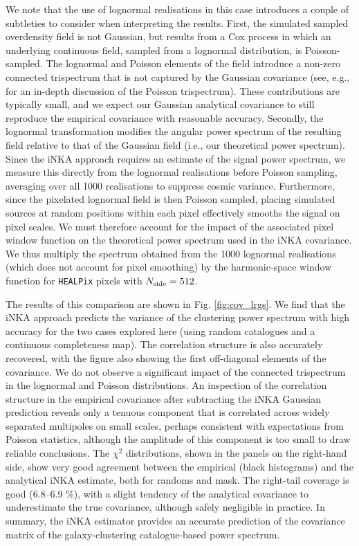 \documentclass[%
 reprint,
superscriptaddress,
nofootinbib,
 amsmath,amssymb,
 aps,
 prd,
]{revtex4-2}
\begin{document}
    We note that the use of lognormal realisations in this case introduces a couple of subtleties to consider when interpreting the results. First, the simulated sampled overdensity field is not Gaussian, but results from a Cox process in which an underlying continuous field, sampled from a lognormal distribution, is Poisson-sampled. The lognormal and Poisson elements of the field introduce a non-zero connected trispectrum that is not captured by the Gaussian covariance (see, e.g., \cite{2507.03749} for an in-depth discussion of the Poisson trispectrum). These contributions are typically small, and we expect our Gaussian analytical covariance to still reproduce the empirical covariance with reasonable accuracy. Secondly, the lognormal transformation modifies the angular power spectrum of the resulting field relative to that of the Gaussian field (i.e., our theoretical power spectrum). Since the iNKA approach requires an estimate of the signal power spectrum, we measure this directly from the lognormal realisations before Poisson sampling, averaging over all 1000 realisations to suppress cosmic variance. Furthermore, since the pixelated lognormal field is then Poisson sampled, placing simulated sources at random positions within each pixel effectively smooths the signal on pixel scales. We must therefore account for the impact of the associated pixel window function on the theoretical power spectrum used in the iNKA covariance. We thus multiply the spectrum obtained from the 1000 lognormal realisations (which does not account for pixel smoothing) by the harmonic-space window function for \texttt{HEALPix} pixels with $N_{\rm side}=512$.

    The results of this comparison are shown in Fig. \ref{fig:cov_lrgs}. We find that the iNKA approach predicts the variance of the clustering power spectrum with high accuracy for the two cases explored here (using random catalogues and a continuous completeness map). The correlation structure is also accurately recovered, with the figure also showing the first off-diagonal elements of the covariance. We do not observe a significant impact of the connected trispectrum in the lognormal and Poisson distributions. An inspection of the correlation structure in the empirical covariance after subtracting the iNKA Gaussian prediction reveals only a tenuous component that is correlated across widely separated multipoles on small scales, perhaps consistent with expectations from Poisson statistics, although the amplitude of this component is too small to draw reliable conclusions. The $\chi^2$ distributions, shown in the panels on the right-hand side, show very good agreement between the empirical (black histograms) and the analytical iNKA estimate, both for randoms and mask. The right-tail coverage is good (6.8--6.9 $\%$), with a slight tendency of the analytical covariance to underestimate the true covariance, although safely negligible in practice. In summary, the iNKA estimator provides an accurate prediction of the covariance matrix of the galaxy-clustering catalogue-based power spectrum.
\end{document}
